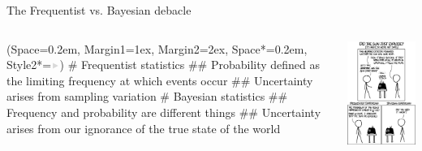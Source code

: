 \documentclass[12pt, aspectratio=149]{beamer}
\newcommand{\listSpace}{0.2em}
\theoremstyle{plain}
\begin{document}
\begin{frame}[fragile]{The Frequentist vs. Bayesian debacle}
	\begin{columns}
		\begin{column}{0.7\linewidth}
			\begin{easylist}
				\ListProperties(Space=\listSpace, Margin1=1ex, Margin2=2ex, Space*=\listSpace, Style2*=$\color{bggraydark}\blacktriangleright$\space)
				# Frequentist statistics
				## Probability defined as the limiting frequency at which events occur
				## Uncertainty arises from sampling variation
				# Bayesian statistics
				## Frequency and probability are different things
				## Uncertainty arises from our ignorance of the true state of the world
			\end{easylist}
		\end{column}
		\begin{column}{0.3\textwidth}
			\includegraphics[height=0.7\textheight]{figs/relevant_xkcd.png}
		\end{column}
	\end{columns}
\end{frame}
\end{document}
